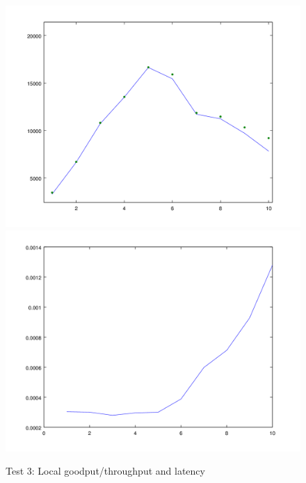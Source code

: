 \documentclass{article}      %
\begin{document}
\begin{figure}[ht]
\centering
 \includegraphics[scale=.33]{graphs/graph5-goodput}
 \includegraphics[scale=.33]{graphs/graph5-latency}
\caption{Test 3: Local goodput/throughput and latency \label{overflow}}
\end{figure}
\end{document}
